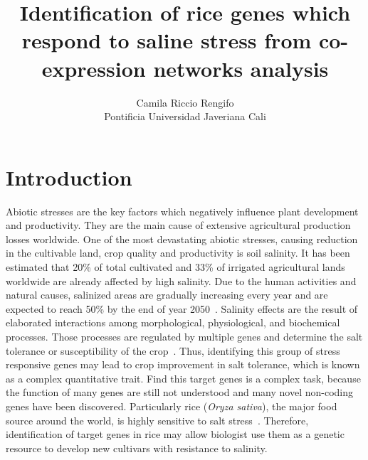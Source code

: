 \documentclass[12pt,journal, onecolumn]{IEEEtran}
\title{Identification of rice genes which respond to saline stress from co-expression networks analysis}
\author{Camila Riccio Rengifo\\
  \small Pontificia Universidad Javeriana Cali\\
}
\begin{document}
\maketitle


\section*{Introduction}
Abiotic stresses are the key factors which negatively influence plant development and productivity. They are the main cause of extensive agricultural production losses worldwide. One of the most devastating abiotic stresses, causing reduction in the cultivable land, crop quality and productivity is soil salinity. It has been estimated that 20\% of total cultivated and 33\% of irrigated agricultural lands worldwide are already affected by high salinity. Due to the human activities and natural causes, salinized areas are gradually increasing every year and are expected to reach 50\% by the end of year 2050~\cite{shrivastava2015soil}. Salinity effects are the result of elaborated interactions among morphological, physiological, and biochemical processes. Those processes are regulated by multiple genes and determine the salt tolerance or susceptibility of the crop~\cite{reddy2017salt}. Thus, identifying this group of stress responsive genes may lead to crop improvement in salt tolerance, which is known as a complex quantitative trait. Find this target genes is a complex task, because the function of many genes are still not understood and many novel non-coding genes have been discovered. Particularly rice (\textit{Oryza sativa}), the major food source around the world, is highly sensitive to salt stress~\cite{chang2019morphological}. Therefore, identification of target genes in rice may allow biologist use them as a genetic resource to develop new cultivars with resistance to salinity.\\
\end{document}
